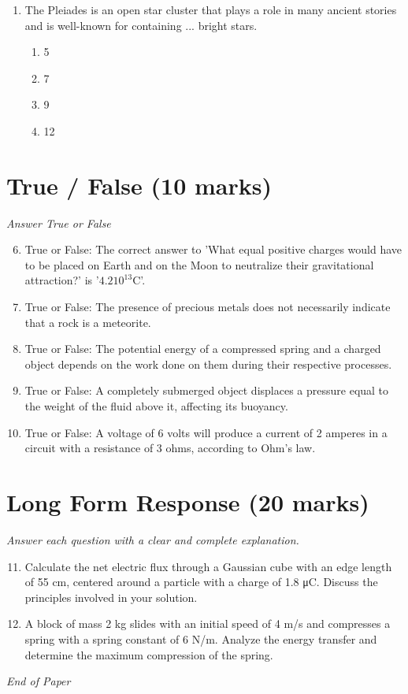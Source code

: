 \documentclass[12pt]{article}
\begin{document}
\begin{enumerate}[label=\arabic*.]
\begin{enumerate}[label=(\alph*)]
    \item 5.5
    \item 1.8
    \item 4.2
\end{enumerate}
\item The Pleiades is an open star cluster that plays a role in many ancient stories and is well-known for containing ... bright stars.
\begin{enumerate}[label=(\alph*)]
    \item 5
    \item 7
    \item 9
    \item 12
\end{enumerate}
\end{enumerate}

\section*{True / False (10 marks)}
\textit{Answer True or False}
\begin{enumerate}[label=\arabic*.]
\setcounter{enumi}{5}
\item True or False: The correct answer to 'What equal positive charges would have to be placed on Earth and on the Moon to neutralize their gravitational attraction?' is '$4.2$$10^{13} \mathrm{C}$'.
\item True or False: The presence of precious metals does not necessarily indicate that a rock is a meteorite.
\item True or False: The potential energy of a compressed spring and a charged object depends on the work done on them during their respective processes.
\item True or False: A completely submerged object displaces a pressure equal to the weight of the fluid above it, affecting its buoyancy.
\item True or False: A voltage of 6 volts will produce a current of 2 amperes in a circuit with a resistance of 3 ohms, according to Ohm's law.
\end{enumerate}

\section*{Long Form Response (20 marks)}
\textit{Answer each question with a clear and complete explanation.}
\begin{enumerate}[label=\arabic*.]
\setcounter{enumi}{10}
\item Calculate the net electric flux through a Gaussian cube with an edge length of 55 cm, centered around a particle with a charge of 1.8 μC. Discuss the principles involved in your solution.
\item A block of mass 2 kg slides with an initial speed of 4 m/s and compresses a spring with a spring constant of 6 N/m. Analyze the energy transfer and determine the maximum compression of the spring.
\end{enumerate}

\vfill
\noindent\textit{End of Paper}
\end{document}
